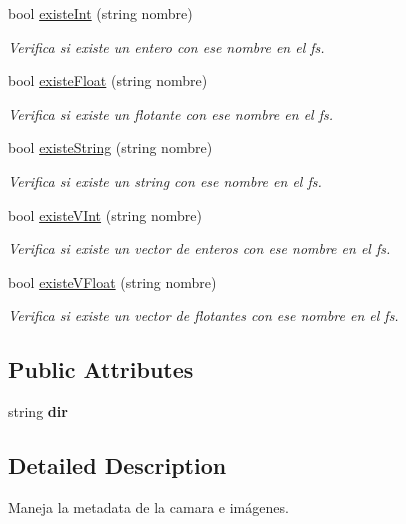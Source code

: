 \begin{DoxyCompactItemize}
bool \mbox{\hyperlink{classFSManager_aae892b79cec4fc940972e9ab008e241e}{existe\+Int}} (string nombre)
\begin{DoxyCompactList}\small\item\em Verifica si existe un entero con ese nombre en el fs. \end{DoxyCompactList}\item 
bool \mbox{\hyperlink{classFSManager_a73be0c1d4d7aa7584f41c7bab0075bb2}{existe\+Float}} (string nombre)
\begin{DoxyCompactList}\small\item\em Verifica si existe un flotante con ese nombre en el fs. \end{DoxyCompactList}\item 
bool \mbox{\hyperlink{classFSManager_a0756a23591bc8fcd3c40a58af9881d34}{existe\+String}} (string nombre)
\begin{DoxyCompactList}\small\item\em Verifica si existe un string con ese nombre en el fs. \end{DoxyCompactList}\item 
bool \mbox{\hyperlink{classFSManager_a500170a86c9fcaddd716fe962283742c}{existe\+V\+Int}} (string nombre)
\begin{DoxyCompactList}\small\item\em Verifica si existe un vector de enteros con ese nombre en el fs. \end{DoxyCompactList}\item 
bool \mbox{\hyperlink{classFSManager_a63759864d11b386395f462a7876c2e89}{existe\+V\+Float}} (string nombre)
\begin{DoxyCompactList}\small\item\em Verifica si existe un vector de flotantes con ese nombre en el fs. \end{DoxyCompactList}\end{DoxyCompactItemize}
\subsection*{Public Attributes}
\begin{DoxyCompactItemize}
\item 
\mbox{\label{classFSManager_a1458ba7e170d083b28861dda8167263b}} 
string {\bfseries dir}
\end{DoxyCompactItemize}


\subsection{Detailed Description}
Maneja la metadata de la camara e imágenes. 


